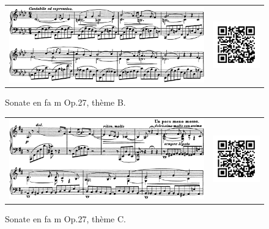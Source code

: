 \begin{figure}[!p]
  \begin{bigcenter}
    \begin{tabular}{lr}
      \includegraphics[width=12.5cm, keepaspectratio]{sonate-theme-B.png}
      &
      \includegraphics[width=3cm, keepaspectratio]{op1-qr.png}
    \end{tabular}
  \end{bigcenter}
  \caption{\label{sonate-theme-2}Sonate en fa m Op.27, thème B.}
\end{figure}

\begin{figure}[!p]
  \begin{bigcenter}
    \begin{tabular}{lr}
      \includegraphics[width=12.5cm, keepaspectratio]{sonate-theme-C.png}
      &
      \includegraphics[width=3cm, keepaspectratio]{op1-qr.png}
    \end{tabular}
  \end{bigcenter}
  \caption{\label{sonate-theme-3}Sonate en fa m Op.27, thème C.}
\end{figure}

